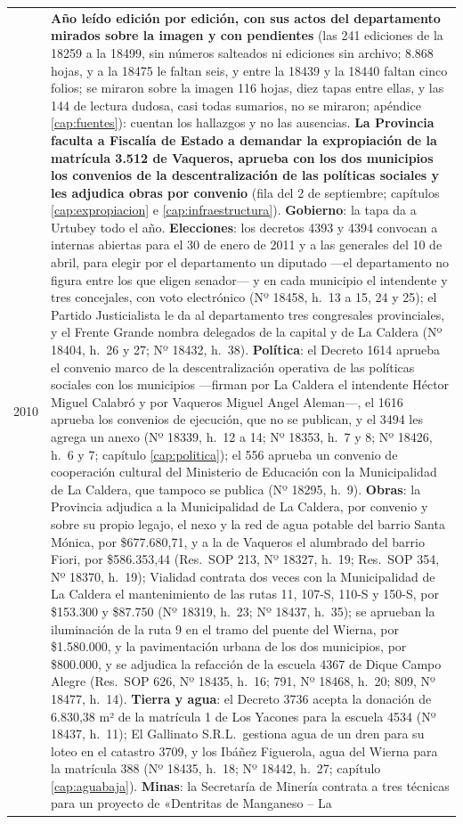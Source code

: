 \begin{longtable}{@{}p{2.7cm}p{10.3cm}@{}}
2010 & \textbf{Año leído edición por edición, con sus actos del departamento mirados sobre la imagen y con pendientes} (las 241 ediciones de la 18259 a la 18499, sin números salteados ni ediciones sin archivo; 8.868 hojas, y a la 18475 le faltan seis, y entre la 18439 y la 18440 faltan cinco folios; se miraron sobre la imagen 116 hojas, diez tapas entre ellas, y las 144 de lectura dudosa, casi todas sumarios, no se miraron; apéndice \ref{cap:fuentes}): cuentan los hallazgos y no las ausencias. \textbf{La Provincia faculta a Fiscalía de Estado a demandar la expropiación de la matrícula 3.512 de Vaqueros, aprueba con los dos municipios los convenios de la descentralización de las políticas sociales y les adjudica obras por convenio} (fila del 2 de septiembre; capítulos \ref{cap:expropiacion} e \ref{cap:infraestructura}). \textbf{Gobierno}: la tapa da a Urtubey todo el año. \textbf{Elecciones}: los decretos 4393 y 4394 convocan a internas abiertas para el 30 de enero de 2011 y a las generales del 10 de abril, para elegir por el departamento un diputado ---el departamento no figura entre los que eligen senador--- y en cada municipio el intendente y tres concejales, con voto electrónico (Nº 18458, h.\ 13 a 15, 24 y 25); el Partido Justicialista le da al departamento tres congresales provinciales, y el Frente Grande nombra delegados de la capital y de La Caldera (Nº 18404, h.\ 26 y 27; Nº 18432, h.\ 38). \textbf{Política}: el Decreto 1614 aprueba el convenio marco de la descentralización operativa de las políticas sociales con los municipios ---firman por La Caldera el intendente Héctor Miguel Calabró y por Vaqueros Miguel Angel Aleman---, el 1616 aprueba los convenios de ejecución, que no se publican, y el 3494 les agrega un anexo (Nº 18339, h.\ 12 a 14; Nº 18353, h.\ 7 y 8; Nº 18426, h.\ 6 y 7; capítulo \ref{cap:politica}); el 556 aprueba un convenio de cooperación cultural del Ministerio de Educación con la Municipalidad de La Caldera, que tampoco se publica (Nº 18295, h.\ 9). \textbf{Obras}: la Provincia adjudica a la Municipalidad de La Caldera, por convenio y sobre su propio legajo, el nexo y la red de agua potable del barrio Santa Mónica, por \$677.680,71, y a la de Vaqueros el alumbrado del barrio Fiori, por \$586.353,44 (Res.\ SOP 213, Nº 18327, h.\ 19; Res.\ SOP 354, Nº 18370, h.\ 19); Vialidad contrata dos veces con la Municipalidad de La Caldera el mantenimiento de las rutas 11, 107-S, 110-S y 150-S, por \$153.300 y \$87.750 (Nº 18319, h.\ 23; Nº 18437, h.\ 35); se aprueban la iluminación de la ruta 9 en el tramo del puente del Wierna, por \$1.580.000, y la pavimentación urbana de los dos municipios, por \$800.000, y se adjudica la refacción de la escuela 4367 de Dique Campo Alegre (Res.\ SOP 626, Nº 18435, h.\ 16; 791, Nº 18468, h.\ 20; 809, Nº 18477, h.\ 14). \textbf{Tierra y agua}: el Decreto 3736 acepta la donación de 6.830,38 m² de la matrícula 1 de Los Yacones para la escuela 4534 (Nº 18437, h.\ 11); El Gallinato S.R.L.\ gestiona agua de un dren para su loteo en el catastro 3709, y los Ibáñez Figuerola, agua del Wierna para la matrícula 388 (Nº 18435, h.\ 18; Nº 18442, h.\ 27; capítulo \ref{cap:aguabaja}). \textbf{Minas}: la Secretaría de Minería contrata a tres técnicas para un proyecto de «Dentritas de Manganeso -- La 
\end{longtable}
